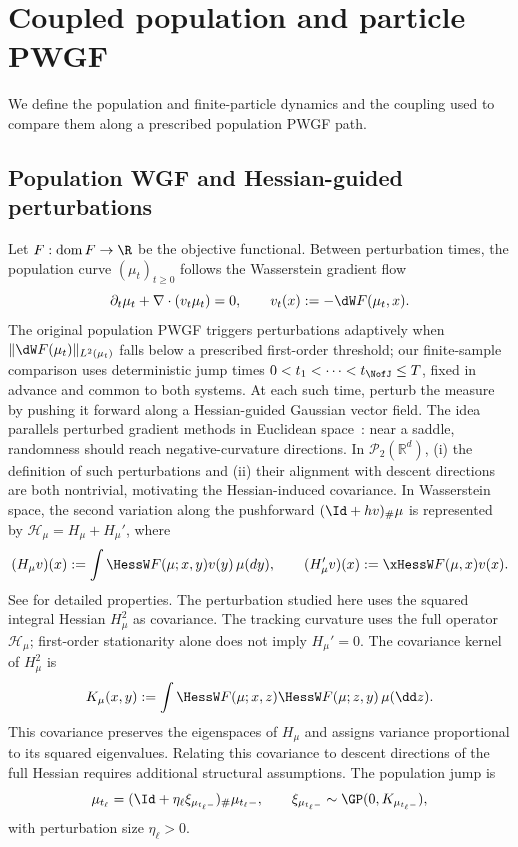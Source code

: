 \section{Coupled population and particle PWGF}
\label{sec:pwgf-coupling}

We define the population and finite-particle dynamics and the coupling used to
compare them along a prescribed population PWGF path.

\subsection{Population WGF and Hessian-guided perturbations}
\label{subsec:population-pwgf}

Let \(F:\operatorname{dom}F\to\R\) be the objective functional.
Between perturbation times, the
population curve \((\mu_t)_{t\ge 0}\) follows the Wasserstein gradient flow
\begin{equation}
    \partial_t \mu_t + \nabla\cdot(v_t\mu_t)=0,
    \qquad
    v_t(x):=-\dW F(\mu_t,x).
    \label{eq:population-wgf}
\end{equation}
The original population PWGF triggers perturbations adaptively when
\(\|\dW F(\mu_t)\|_{L^2(\mu_t)}\) falls below a prescribed first-order threshold;
our finite-sample comparison uses deterministic jump times
$0<t_1<\cdots<t_{\NofJ}\le T$, fixed in advance and common to both systems.
At each such time, \citet{yamamoto2025hessianguided} perturb the measure by pushing it forward along a Hessian-guided Gaussian vector field.  The idea parallels perturbed
gradient methods in Euclidean space~\citep{GeHuangJinYuan2015,pmlr-v75-jin18a}: near a saddle,
randomness should reach negative-curvature directions.  In
\(\mathcal P_2(\mathbb R^d)\), (i) the definition of such perturbations and (ii) their
alignment with descent directions are both nontrivial, motivating the
Hessian-induced covariance.
In Wasserstein space, the second variation
along the pushforward \((\Id+hv)_\#\mu\) is represented by
\(\mathcal H_\mu=H_\mu+H_\mu'\), where
\[
    (H_\mu v)(x):=\int \HessW F(\mu;x,y)v(y)\,\mu(dy),
    \qquad
    (H_\mu'v)(x):=\xHessW F(\mu,x)v(x).
\]
See \citet{ambrosio2005gradient} for detailed properties. The perturbation studied here uses the squared integral
Hessian $H_\mu^2$ as covariance. The tracking curvature uses the full operator
$\mathcal H_\mu$; first-order stationarity alone does not imply $H_\mu'=0$.
The covariance kernel of \(H_\mu^2\) is
\[
    K_\mu(x,y)
    :=
    \int
        \HessW F(\mu;x,z)\HessW F(\mu;z,y)\,\mu(\dd z).
    \label{eq:hessian-kernel}
\]
This covariance preserves the eigenspaces of $H_\mu$ and assigns variance proportional to its squared eigenvalues. Relating this covariance to descent directions of the full Hessian requires additional structural assumptions. The population jump is
\begin{equation}
    \mu_{t_\ell}
    =
    (\Id+\eta_\ell \xi_{\mu_{t_\ell-}})_\#\mu_{t_\ell-},
    \qquad
    \xi_{\mu_{t_\ell-}}\sim \GP(0,K_{\mu_{t_\ell-}}),
    \label{eq:population-jump}
\end{equation}
with perturbation size \(\eta_\ell>0\).

